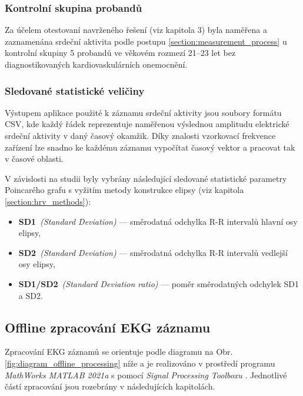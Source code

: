 \subsubsection{Kontrolní skupina probandů}
\label{section:probands}
Za účelem otestovaní navrženého řešení (viz kapitola 3) byla naměřena a
zaznamenána srdeční aktivita podle postupu \ref{section:measurement_process} u
kontrolní skupiny 5 probandů ve věkovém rozmezí 21--23 let bez diagnostikovaných
kardiovaskulárních onemocnění.

\subsubsection{Sledované statistické veličiny}
\label{section:selected_stats_vals}
Výstupem aplikace použité k záznamu srdeční aktivity jsou soubory formátu CSV,
kde každý řádek reprezentuje naměřenou výslednou amplitudu elektrické srdeční
aktivity v daný časový okamžik. Díky znalosti vzorkovací frekvence zařízení lze
snadno ke každému záznamu vypočítat časový vektor a pracovat tak v časové
oblasti.

V závislosti na studii byly vybrány následující sledované statistické parametry
Poincarého grafu s vyžitím metody konstrukce elipsy (viz kapitola
\ref{section:hrv_methods}):
\begin{itemize}[noitemsep]
    \item \textbf{SD1}~\textit{(Standard Deviation)} --- směrodatná odchylka R-R
          intervalů hlavní osy elipsy,
    \item \textbf{SD2}~\textit{(Standard Deviation)} --- směrodatná odchylka R-R
          intervalů vedlejší osy elipsy,
    \item \textbf{SD1/SD2}~\textit{(Standard Deviation ratio)} --- poměr směrodatných odchylek SD1 a SD2.
\end{itemize}

\subsection{Offline zpracování EKG záznamu}
\label{section:offline_processing}
Zpracování EKG záznamů se orientuje podle diagramu na Obr.
\ref{fig:diagram_offline_processing} níže a je realizováno v prostředí programu
\textit{MathWorks MATLAB 2021a} \cite{MATLAB} s pomocí \textit{Signal Processing
    Toolboxu} \text{} \cite{matlabSPT}. Jednotlivé částí zpracování jsou rozebrány v
následujících kapitolách.

